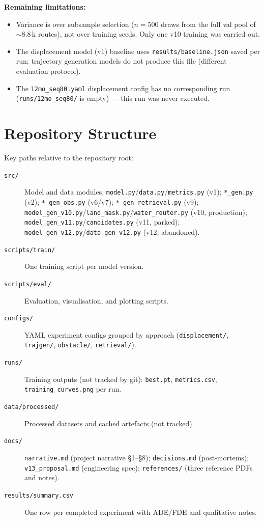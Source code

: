 \documentclass[11pt,a4paper]{article}
\begin{document}
\textbf{Remaining limitations:}
\begin{itemize}
  \item Variance is over subsample selection ($n=500$ draws from the full val
        pool of $\sim$8.8\,k routes), not over training seeds.  Only one v10
        training was carried out.
  \item The displacement model (v1) baseline uses \texttt{results/baseline.json}
        saved per run; trajectory generation models do not produce this file
        (different evaluation protocol).
  \item The \texttt{12mo\_seq80.yaml} displacement config has no corresponding run
        (\texttt{runs/12mo\_seq80/} is empty) --- this run was never executed.
\end{itemize}

\section{Repository Structure}
\label{app:structure}

Key paths relative to the repository root:

\begin{description}
  \item[\texttt{src/}] Model and data modules.
        \texttt{model.py}/\texttt{data.py}/\texttt{metrics.py} (v1);
        \texttt{*\_gen.py} (v2); \texttt{*\_gen\_obs.py} (v6/v7);
        \texttt{*\_gen\_retrieval.py} (v9);
        \texttt{model\_gen\_v10.py}/\texttt{land\_mask.py}/\texttt{water\_router.py} (v10, production);
        \texttt{model\_gen\_v11.py}/\texttt{candidates.py} (v11, parked);
        \texttt{model\_gen\_v12.py}/\texttt{data\_gen\_v12.py} (v12, abandoned).
  \item[\texttt{scripts/train/}] One training script per model version.
  \item[\texttt{scripts/eval/}] Evaluation, visualisation, and plotting scripts.
  \item[\texttt{configs/}] YAML experiment configs grouped by approach
        (\texttt{displacement/}, \texttt{trajgen/}, \texttt{obstacle/}, \texttt{retrieval/}).
  \item[\texttt{runs/}] Training outputs (not tracked by git):
        \texttt{best.pt}, \texttt{metrics.csv}, \texttt{training\_curves.png} per run.
  \item[\texttt{data/processed/}] Processed datasets and cached artefacts (not tracked).
  \item[\texttt{docs/}] \texttt{narrative.md} (project narrative §1--§8);
        \texttt{decisions.md} (post-mortems); \texttt{v13\_proposal.md} (engineering spec);
        \texttt{references/} (three reference PDFs and notes).
  \item[\texttt{results/summary.csv}] One row per completed experiment with ADE/FDE
        and qualitative notes.
\end{description}
\end{document}
